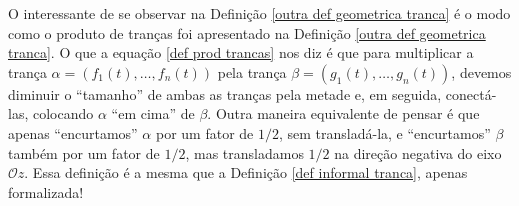 	O interessante de se observar na Definição \ref{outra def geometrica tranca} é 
	o modo como o produto de tranças foi apresentado na Definição \ref{outra def geometrica tranca}. 
	O que a equação \ref{def prod trancas} nos diz é que para multiplicar a trança 
	$\alpha = ( f_1(t), \dots, f_n(t) )$ pela trança $\beta = ( g_1(t), \dots, g_n(t) )$, devemos 
	diminuir o ``tamanho'' de ambas as tranças pela metade e, em seguida, conectá-las, colocando $\alpha$ 
	``em cima'' de $\beta$. Outra maneira equivalente de pensar é que apenas ``encurtamos'' $\alpha$ por 
	um fator de $1/2$, sem transladá-la, e ``encurtamos'' $\beta$ também por um fator de $1/2$, mas 
	transladamos $1/2$ na direção negativa do eixo $\mathcal{O}z$. Essa definição é a mesma que a 
	Definição \ref{def informal tranca}, apenas formalizada!